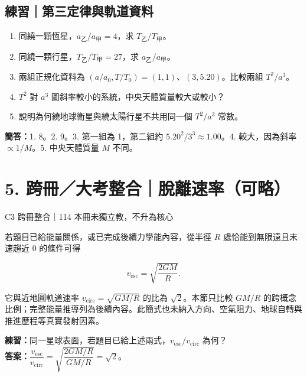 \documentclass[11pt,a4paper]{article}
\providecommand{\tightlist}{%
  \setlength{\itemsep}{0pt}\setlength{\parskip}{0pt}}
\begin{document}
\begin{HandoutSelfCheck}

\subsection{練習｜第三定律與軌道資料}\label{ux7df4ux7fd2ux7b2cux4e09ux5b9aux5f8bux8207ux8eccux9053ux8cc7ux6599}

\begin{enumerate}
\def\labelenumi{\arabic{enumi}.}
\tightlist
\item
  同繞一顆恆星，\(a_{\text{乙}}/a_{\text{甲}}=4\)，求 \(T_{\text{乙}}/T_{\text{甲}}\)。
\item
  同繞一顆行星，\(T_{\text{乙}}/T_{\text{甲}}=27\)，求 \(a_{\text{乙}}/a_{\text{甲}}\)。
\item
  兩組正規化資料為 \((a/a_0,T/T_0)=(1,1)\)、\((3,5.20)\)。比較兩組 \(T^2/a^3\)。
\item
  \(T^2\) 對 \(a^3\) 圖斜率較小的系統，中央天體質量較大或較小？
\item
  說明為何繞地球衛星與繞太陽行星不共用同一個 \(T^2/a^3\) 常數。
\end{enumerate}

\textbf{簡答：}1. 8。2. 9。3. 第一組為 1，第二組約 \(5.20^2/3^3\approx1.00\)。4. 較大，因為斜率 \(\propto1/M\)。5. 中央天體質量 \(M\) 不同。

\end{HandoutSelfCheck}

\section{5. 跨冊／大考整合｜脫離速率（可略）}\label{ux8de8ux518aux5927ux8003ux6574ux5408ux812bux96e2ux901fux7387ux53efux7565}

{C3 跨冊整合｜114 本冊未獨立教，不升為核心}

若題目已給能量關係，或已完成後續力學能內容，從半徑 \(R\) 處恰能到無限遠且末速趨近 0 的條件可得

\[
v_{\mathrm{esc}}=\sqrt{\frac{2GM}{R}}.
\]

它與近地圓軌道速率 \(v_{\mathrm{circ}}=\sqrt{GM/R}\) 的比為 \(\sqrt2\)。本節只比較 \(GM/R\) 的跨概念比例；完整能量推導列為後續內容。此簡式也未納入方向、空氣阻力、地球自轉與推進歷程等真實發射因素。

\textbf{練習：}同一星球表面，若題目已給上述兩式，\(v_{\mathrm{esc}}/v_{\mathrm{circ}}\) 為何？\\
\textbf{答案：}\(\dfrac{v_{\mathrm{esc}}}{v_{\mathrm{circ}}}=\sqrt{\dfrac{2GM/R}{GM/R}}=\sqrt2\)。
\end{document}
